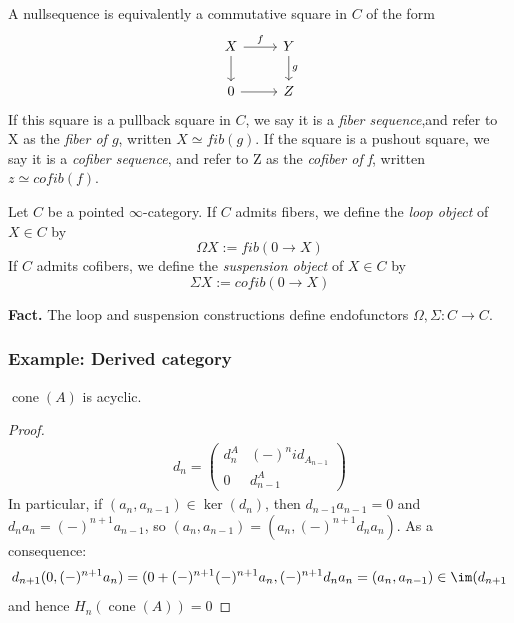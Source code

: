 \begin{remark}
 A nullsequence is equivalently a commutative square in $C$ of the form
\[\begin{tikzcd}[sep=small]
	X && Y \\
	\\
	0 && Z
	\arrow["f", from=1-1, to=1-3]
	\arrow[from=1-1, to=3-1]
	\arrow["g", from=1-3, to=3-3]
	\arrow[from=3-1, to=3-3]
\end{tikzcd}\]  
If this square is a pullback square in $C$, we say it is a \emph{fiber sequence},and refer to X as the \emph{fiber of $g$},
written $X\simeq fib(g)$. If the square is a pushout square, we say it is a \emph{cofiber sequence}, and refer to Z
as the \emph{cofiber of f}, written $z \simeq cofib(f)$.
\end{remark}

\begin{definition}
    Let $C$ be a pointed $\infty$-category. If $C$ admits fibers, we
define the \emph{loop object} of $X\in C$ by
\[\Omega X:= fib(0\to X)\]
If $C$ admits cofibers, we
define the \emph{suspension object} of $X\in C$ by
\[\Sigma X:=cofib(0\to X)\]
\end{definition}
\textbf{Fact.} The loop and suspension constructions define endofunctors $\Omega,\Sigma:C\to C$. 
\subsubsection{Example: Derived category}
\begin{proposition}
    $\operatorname{cone}(A)$ is acyclic.
\end{proposition}
\begin{proof}
    \begin{align*}
    d_n=\begin{pmatrix}
    d^A_n&(-)^n id_{A_{n-1}}\\
    0& d^A_{n-1}
\end{pmatrix}
\end{align*}
In particular, if $(a_n, a_{n-1})\in \ker(d_n)$, then $d_{n-1}a_{n-1}=0$ and $d_n a_n=(-)^{n+1}a_{n-1}$, so  $(a_n, a_{n-1})= (a_n, (-)^{n+1}d_n a_n)$. As a consequence:
\[d_{n+1}(0,(-)^{n+1}a_n)=(0+(-)^{n+1}(-)^{n+1}a_n,(-)^{n+1}d_n a_n=(a_n,a_{n-1})\in \im(d_{n+1}\]
and hence $H_n(\operatorname{cone}(A))=0$
\end{proof}

